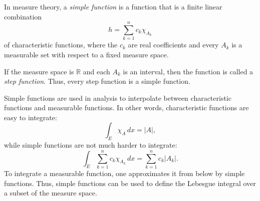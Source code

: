 \documentclass{article}
\begin{document}
In measure theory, a \emph{simple function} is a function that is a
finite linear combination
\[
h = \sum_{k=1}^n c_k \chi_{A_k}
\]
of characteristic functions, where the $c_k$ are real coefficients and
every $A_k$ is a measurable set with respect to a fixed measure space.

If the measure space is $\mathbb{R}$ and each $A_k$ is an interval,
then the function is called a \emph{step function}.  Thus, every step
function is a simple function.

Simple functions are used in analysis to interpolate between
characteristic functions and measurable functions.  In other words,
characteristic functions are easy to integrate:
\[
\int_E \chi_{A}\,dx = |A|,
\]
while simple functions are not much harder to integrate:
\[
\int_E \sum_{k=1}^n c_k \chi_{A_k}\,dx = \sum_{k=1}^n c_k |A_k|.
\]
To integrate a measurable function, one approximates it from below by
simple functions.  Thus, simple functions can be used to define the
Lebesgue integral over a subset of the measure space.

\end{document}
